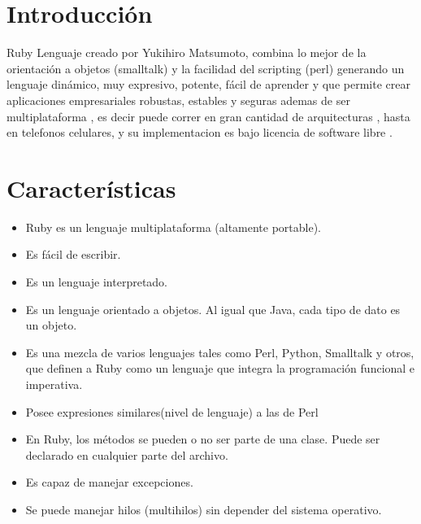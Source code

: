 \documentclass[11pt]{article} %
\begin{document}
\section{\fontsize{14}{0} \bf Introducción}

 Ruby  Lenguaje creado por Yukihiro Matsumoto,  combina lo mejor de la orientación a objetos (smalltalk) y la facilidad del scripting (perl) generando un lenguaje dinámico, muy expresivo, potente, fácil de aprender y que permite crear aplicaciones empresariales robustas, estables y seguras ademas de ser  multiplataforma , es decir puede correr en gran cantidad de arquitecturas , hasta en telefonos celulares, y su implementacion es bajo licencia de software libre .


\section{\fontsize{14}{0} \bf Características}

\begin{itemize}

      \item  Ruby es un lenguaje multiplataforma (altamente portable).
      \item  Es fácil de escribir. 
      \item  Es un lenguaje interpretado.
      \item  Es un lenguaje orientado a objetos. Al igual que Java, cada tipo de dato es un objeto.
      \item  Es una mezcla de varios lenguajes tales como Perl, Python, Smalltalk y otros, que definen a Ruby como un lenguaje que integra la programación funcional e imperativa.
      \item  Posee expresiones similares(nivel de lenguaje) a las de Perl
      \item  En Ruby, los métodos se pueden o no ser parte de una clase. Puede ser declarado en cualquier parte del archivo.
      \item  Es capaz de manejar excepciones.
      \item  Se puede manejar hilos (multihilos) sin depender del sistema operativo.

\end{itemize}
\end{document}
